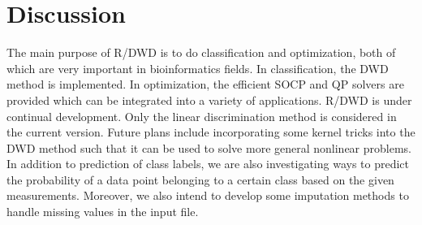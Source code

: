 \documentclass{bioinfo}
\begin{document}
\section{Discussion}
The main purpose of R/DWD is to do classification and optimization,
both of which are very important in bioinformatics fields. In
classification, the DWD method is implemented. In optimization, the
efficient SOCP and QP solvers are provided which can be integrated
into a variety of applications. R/DWD is under continual
development. Only the linear discrimination method is considered in
the current version. Future plans include incorporating some kernel
tricks into the DWD method such that it can be used to solve more
general nonlinear problems. In addition to prediction of class labels,
we are also investigating ways to predict the probability of a data
point belonging to a certain class based on the given
measurements. Moreover, we also intend to develop some imputation
methods to handle missing values in the input file.
\end{document}

